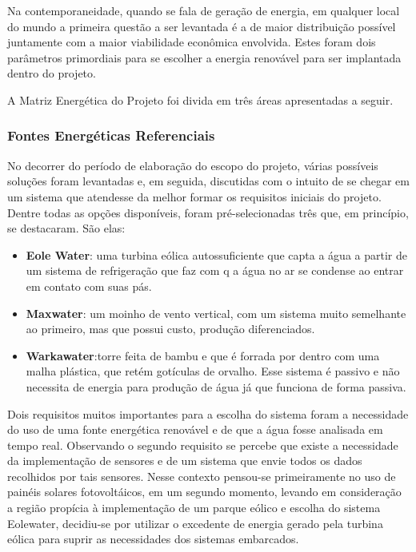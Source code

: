 
Na contemporaneidade, quando se fala de geração de energia, em qualquer local do mundo a primeira questão a ser levantada
é a de maior distribuição possível juntamente com a maior viabilidade econômica envolvida. Estes foram dois parâmetros 
primordiais para se escolher a energia renovável para ser implantada dentro do projeto.

A Matriz Energética do Projeto foi divida em três áreas apresentadas a seguir.

  \subsubsection{Fontes Energéticas Referenciais}
    
    No decorrer do período de elaboração do escopo do projeto, várias possíveis soluções foram levantadas e, em seguida, 
    discutidas com o intuito de se chegar em um sistema que atendesse da melhor formar os requisitos iniciais do projeto.
    Dentre todas as opções disponíveis, foram pré-selecionadas três que, em princípio, se destacaram. São elas:
    
    \begin{itemize}
      \item \textbf{Eole Water}: uma turbina eólica autossuficiente que capta a água a partir de um sistema de refrigeração
	que faz com q a água no ar se condense ao entrar em contato com suas pás.
     
      \item \textbf{Maxwater}: um moinho de vento vertical, com um sistema muito semelhante ao primeiro, mas que possui custo,
	produção diferenciados.
      
      \item \textbf{Warkawater}:torre feita de bambu e que é forrada por dentro com uma malha plástica, que retém gotículas
	de orvalho. Esse sistema é passivo e não necessita de energia para produção de água já que funciona de forma passiva.
    \end{itemize}
  
    Dois requisitos muitos importantes para a escolha do sistema foram a necessidade do uso de uma fonte energética renovável
    e de que a água fosse analisada em tempo real. Observando o segundo requisito se percebe que existe a necessidade da
    implementação de sensores e de um sistema que envie todos os dados recolhidos por tais sensores. Nesse contexto pensou-se 
    primeiramente no uso de painéis solares fotovoltáicos, em um segundo momento, levando em consideração a região propícia à 
    implementação de um parque eólico e escolha do sistema Eolewater, decidiu-se por utilizar o excedente de energia gerado 
    pela turbina eólica para suprir as necessidades dos sistemas embarcados.
  
